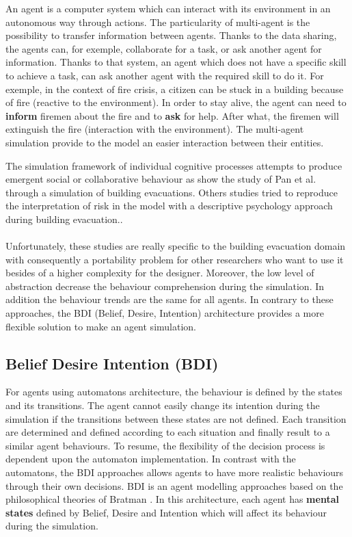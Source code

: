 \documentclass[12pt, a4paper]{memoir} %
\begin{document}
			An agent is a computer system which can interact with its environment in an autonomous way through actions.
			The particularity of multi-agent is the possibility to transfer information between agents. Thanks to the data sharing,
			the agents can, for exemple, collaborate for a task, or ask another agent for information.
			Thanks to that system, an agent which does not have a specific skill to achieve a task, can ask another agent with the
			required skill to do it.
			For exemple, in the context of fire crisis, a citizen can be stuck in a building because of fire (reactive to the environment).
			In order to stay alive, the agent can need to \textbf{inform} firemen about the fire and to \textbf{ask} for help.
			After what, the firemen will extinguish the fire (interaction with the environment).
			The multi-agent simulation provide to the model an easier interaction between their entities.

			The simulation framework of individual cognitive processes attempts to produce emergent social or collaborative behaviour as
			show the study of Pan et al. \cite{pan2007} through a simulation of building evacuations.
			Others studies tried to reproduce the interpretation of risk in the model with a descriptive psychology approach
			during building evacuation.\cite{kinateder2014}.

			\paragraph{}
			Unfortunately, these studies are really specific to the building evacuation domain with consequently a portability problem for other researchers who want to use
			it besides of a higher complexity for the designer.
			Moreover, the low level of abstraction decrease the behaviour comprehension during the simulation. In addition the behaviour trends are the same for all agents.
	    In contrary to these approaches, the BDI (Belief, Desire, Intention) architecture provides a more flexible solution to make an agent simulation.

		\subsection{Belief Desire Intention (BDI)}

			For agents using automatons architecture, the behaviour is defined by the states and its transitions. The agent cannot easily change its intention
			during the simulation if the transitions between these states are not defined. Each transition are determined and defined according to each situation
			and finally result to a similar agent behaviours. To resume, the flexibility of the decision process is dependent upon the automaton implementation.
			In contrast with the automatons, the BDI approaches allows agents to have more realistic behaviours through their own decisions.
			BDI is an agent modelling approaches based on the philosophical theories of Bratman \cite{anand1995}.
			In this architecture, each agent has \textbf{mental states} defined by Belief, Desire and Intention which will affect its behaviour during the simulation.
\end{document}

